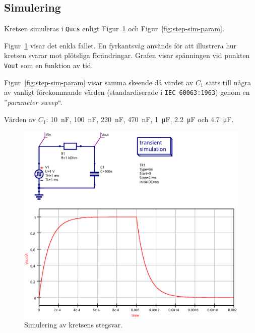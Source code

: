 \subsection{Simulering}\label{}
Kretsen simuleras i \texttt{Qucs} enligt Figur~\ref{fig:step-sim-step} och
Figur~\ref{fig:step-sim-param}.

Figur~\ref{fig:step-sim-step} visar det enkla fallet. En fyrkantsvåg används
för att illustrera hur kretsen svarar mot plötsliga förändringar. Grafen visar
spänningen vid punkten \texttt{Vout} som en funktion av tid.

Figur~\ref{fig:step-sim-param} visar samma skeende då värdet av $C_1$ sätts
till några av vanligt förekommande värden (standardiserade i \texttt{IEC
60063:1963}) genom en ''\emph{parameter sweep}``.  \par
Värden av $C_1$: \SI{10}{\nano\farad},  \SI{100}{\nano\farad},
                 \SI{220}{\nano\farad}, \SI{470}{\nano\farad},
                 \SI{1}{\micro\farad},  \SI{2.2}{\micro\farad}
             och \SI{4.7}{\micro\farad}.


\begin{figure}[ht]\label{fig:step-sim-step}
  \centering
  \includegraphics[width=\linewidth]{sim/ee466_lab-4_prj/uppgift-2_step}
  \caption[] {Simulering av kretsens stegsvar.}
\end{figure}

